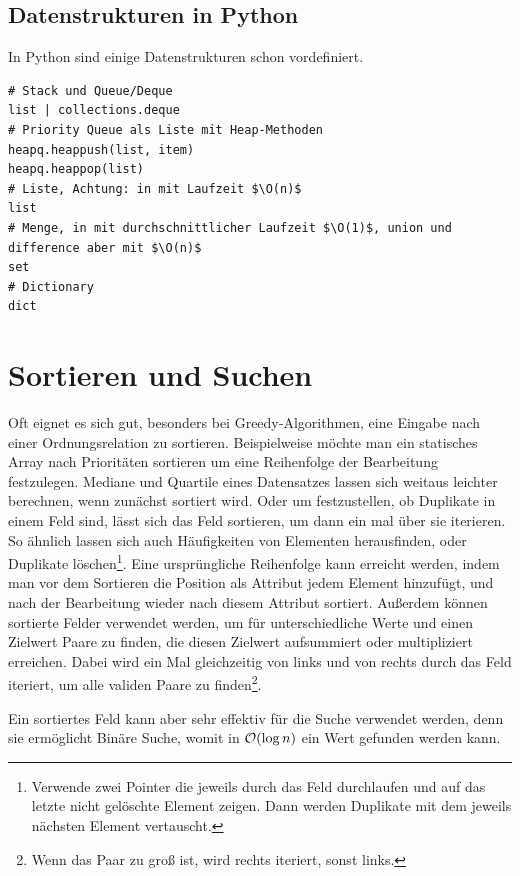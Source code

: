 \subsection{Datenstrukturen in Python}
In Python sind einige Datenstrukturen schon vordefiniert.
\begin{lstlisting}
# Stack und Queue/Deque
list | collections.deque
# Priority Queue als Liste mit Heap-Methoden
heapq.heappush(list, item)
heapq.heappop(list)
# Liste, Achtung: in mit Laufzeit $\O(n)$
list
# Menge, in mit durchschnittlicher Laufzeit $\O(1)$, union und difference aber mit $\O(n)$
set
# Dictionary
dict
\end{lstlisting}

\section{Sortieren und Suchen}
Oft eignet es sich gut, besonders bei Greedy-Algorithmen, eine Eingabe nach einer Ordnungsrelation zu sortieren.
Beispielweise möchte man ein statisches Array nach Prioritäten sortieren um eine Reihenfolge der Bearbeitung festzulegen.
Mediane und Quartile eines Datensatzes lassen sich weitaus leichter berechnen, wenn zunächst sortiert wird.
Oder um festzustellen, ob Duplikate in einem Feld sind, lässt sich das Feld sortieren, um dann ein mal über sie iterieren.
So ähnlich lassen sich auch Häufigkeiten von Elementen herausfinden, oder Duplikate löschen\footnote{Verwende zwei Pointer die jeweils durch das Feld durchlaufen und auf das letzte nicht gelöschte Element zeigen. Dann werden Duplikate mit dem jeweils nächsten Element vertauscht.}.
Eine ursprüngliche Reihenfolge kann erreicht werden, indem man vor dem Sortieren die Position als Attribut jedem Element hinzufügt, und nach der Bearbeitung wieder nach diesem Attribut sortiert.
Außerdem können sortierte Felder verwendet werden, um für unterschiedliche Werte und einen Zielwert Paare zu finden, die diesen Zielwert aufsummiert oder multipliziert erreichen.
Dabei wird ein Mal gleichzeitig von links und von rechts durch das Feld iteriert, um alle validen Paare zu finden\footnote{Wenn das Paar zu groß ist, wird rechts iteriert, sonst links.}.

Ein sortiertes Feld kann aber sehr effektiv für die Suche verwendet werden, denn sie ermöglicht Binäre Suche, womit in \(\mathcal O(\log n)\) ein Wert gefunden werden kann.

